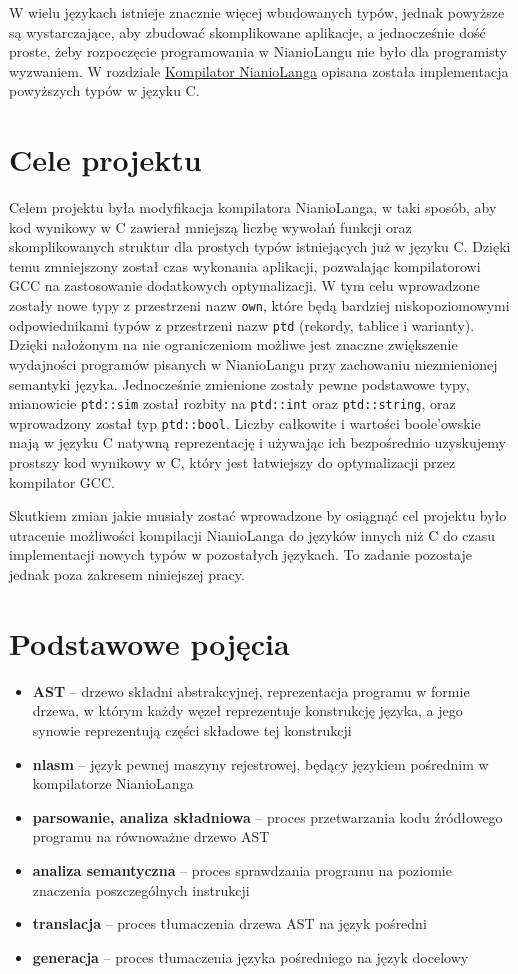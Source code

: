 \documentclass[licencjacka]{pracamgr}
\begin{document}
W wielu językach istnieje znacznie więcej wbudowanych typów, jednak powyższe są wystarczające, aby zbudować skomplikowane aplikacje,
a jednocześnie dość proste, żeby rozpoczęcie programowania w NianioLangu nie było dla programisty wyzwaniem.
W rozdziale \hyperref[sec:compiler]{Kompilator NianioLanga} opisana została implementacja powyższych typów w języku C.

\section{Cele projektu}
Celem projektu była modyfikacja kompilatora NianioLanga, w taki sposób, aby kod wynikowy w C zawierał mniejszą liczbę wywołań funkcji oraz
skomplikowanych
struktur dla prostych typów istniejących już w języku C.
Dzięki temu zmniejszony został czas wykonania aplikacji, pozwalając kompilatorowi GCC na zastosowanie dodatkowych optymalizacji.
W tym celu wprowadzone zostały nowe typy z przestrzeni nazw \texttt{own},
które będą bardziej niskopoziomowymi odpowiednikami typów z przestrzeni nazw \texttt{ptd} (rekordy, tablice i warianty).
Dzięki nałożonym na nie ograniczeniom możliwe jest znaczne zwiększenie wydajności programów pisanych w NianioLangu przy zachowaniu
niezmienionej semantyki języka.
Jednocześnie zmienione zostały pewne podstawowe typy, mianowicie \texttt{ptd::sim} został rozbity na
\texttt{ptd::int} oraz \texttt{ptd::string}, oraz wprowadzony został typ \texttt{ptd::bool}.
Liczby całkowite i wartości boole'owskie mają w języku C natywną reprezentację i używając ich bezpośrednio
uzyskujemy prostszy kod wynikowy w C, który jest łatwiejszy do optymalizacji przez kompilator GCC.

Skutkiem zmian jakie musiały zostać wprowadzone by osiągnąć cel projektu było utracenie możliwości
kompilacji NianioLanga do języków innych niż C do czasu implementacji nowych typów w pozostałych językach.
To zadanie pozostaje jednak poza zakresem niniejszej pracy.

\section{Podstawowe pojęcia}
\begin{itemize}
  \item[] \textbf{AST} -- drzewo składni abstrakcyjnej, reprezentacja programu w formie drzewa, w którym każdy węzeł
    reprezentuje konstrukcję języka, a jego synowie reprezentują części składowe tej konstrukcji
  \item[] \textbf{nlasm} -- język pewnej maszyny rejestrowej, będący językiem pośrednim w kompilatorze NianioLanga
  \item[] \textbf{parsowanie, analiza składniowa} -- proces przetwarzania kodu źródłowego programu na równoważne drzewo AST
  \item[] \textbf{analiza semantyczna} -- proces sprawdzania programu na poziomie znaczenia poszczególnych instrukcji
  \item[] \textbf{translacja} -- proces tłumaczenia drzewa AST na język pośredni
  \item[] \textbf{generacja} -- proces tłumaczenia języka pośredniego na język docelowy
\end{itemize}
\end{document}
